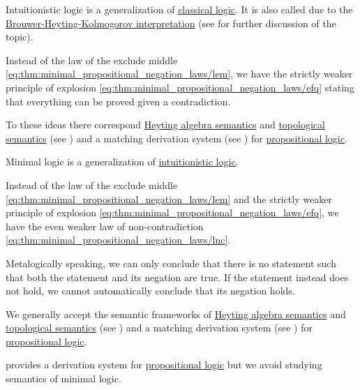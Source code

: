 \begin{definition}\label{def:intuitionistic_logic}
  Intuitionistic logic is a generalization of \hyperref[def:classical_logic]{classical logic}. It is also called  due to the \hyperref[def:brouwer_heyting_kolmogorov_interpretation]{Brouwer-Heyting-Kolmogorov interpretation} (see  for further discussion of the topic).

  Instead of the law of the exclude middle \eqref{eq:thm:minimal_propositional_negation_laws/lem}, we have the strictly weaker principle of explosion \eqref{eq:thm:minimal_propositional_negation_laws/efq} stating that everything can be proved given a contradiction.

  To these ideas there correspond \hyperref[def:propositional_heyting_algebra_semantics]{Heyting algebra semantics} and \hyperref[def:propositional_topological_semantics]{topological semantics} (see ) and a matching derivation system (see ) for \hyperref[subsec:propositional_logic]{propositional logic}.
\end{definition}

\begin{definition}\label{def:minimal_logic}
  Minimal logic is a generalization of \hyperref[def:intuitionistic_logic]{intuitionistic logic}.

  Instead of the law of the exclude middle \eqref{eq:thm:minimal_propositional_negation_laws/lem} and the strictly weaker principle of explosion \eqref{eq:thm:minimal_propositional_negation_laws/efq}, we have the even weaker law of non-contradiction \eqref{eq:thm:minimal_propositional_negation_laws/lnc}.

  Metalogically speaking, we can only conclude that there is no statement such that both the statement and its negation are true. If the statement instead does not hold, we cannot automatically conclude that its negation holds.

  We generally accept the semantic frameworks of \hyperref[def:propositional_heyting_algebra_semantics]{Heyting algebra semantics} and \hyperref[def:propositional_topological_semantics]{topological semantics} (see ) and a matching derivation system (see ) for \hyperref[subsec:propositional_logic]{propositional logic}.

   provides a derivation system for \hyperref[subsec:propositional_logic]{propositional logic} but we avoid studying semantics of minimal logic.
\end{definition}


